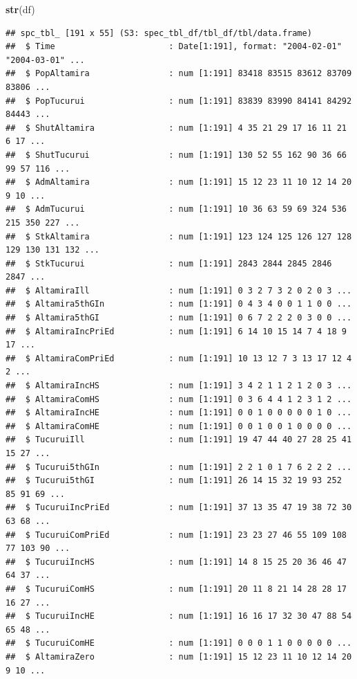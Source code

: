\documentclass[
]{article}
\newenvironment{Shaded}{\begin{snugshade}}{\end{snugshade}}
\newcommand{\FunctionTok}[1]{\textcolor[rgb]{0.13,0.29,0.53}{\textbf{#1}}}
\newcommand{\NormalTok}[1]{#1}
\begin{document}
\begin{Shaded}
\begin{Highlighting}[]
\FunctionTok{str}\NormalTok{(df)}
\end{Highlighting}
\end{Shaded}

\begin{verbatim}
## spc_tbl_ [191 x 55] (S3: spec_tbl_df/tbl_df/tbl/data.frame)
##  $ Time                       : Date[1:191], format: "2004-02-01" "2004-03-01" ...
##  $ PopAltamira                : num [1:191] 83418 83515 83612 83709 83806 ...
##  $ PopTucurui                 : num [1:191] 83839 83990 84141 84292 84443 ...
##  $ ShutAltamira               : num [1:191] 4 35 21 29 17 16 11 21 6 17 ...
##  $ ShutTucurui                : num [1:191] 130 52 55 162 90 36 66 99 57 116 ...
##  $ AdmAltamira                : num [1:191] 15 12 23 11 10 12 14 20 9 10 ...
##  $ AdmTucurui                 : num [1:191] 10 36 63 59 69 324 536 215 350 227 ...
##  $ StkAltamira                : num [1:191] 123 124 125 126 127 128 129 130 131 132 ...
##  $ StkTucurui                 : num [1:191] 2843 2844 2845 2846 2847 ...
##  $ AltamiraIll                : num [1:191] 0 3 2 7 3 2 0 2 0 3 ...
##  $ Altamira5thGIn             : num [1:191] 0 4 3 4 0 0 1 1 0 0 ...
##  $ Altamira5thGI              : num [1:191] 0 6 7 2 2 2 0 3 0 0 ...
##  $ AltamiraIncPriEd           : num [1:191] 6 14 10 15 14 7 4 18 9 17 ...
##  $ AltamiraComPriEd           : num [1:191] 10 13 12 7 3 13 17 12 4 2 ...
##  $ AltamiraIncHS              : num [1:191] 3 4 2 1 1 2 1 2 0 3 ...
##  $ AltamiraComHS              : num [1:191] 0 3 6 4 4 1 2 3 1 2 ...
##  $ AltamiraIncHE              : num [1:191] 0 0 1 0 0 0 0 0 1 0 ...
##  $ AltamiraComHE              : num [1:191] 0 0 1 0 0 1 0 0 0 0 ...
##  $ TucuruiIll                 : num [1:191] 19 47 44 40 27 28 25 41 15 27 ...
##  $ Tucurui5thGIn              : num [1:191] 2 2 1 0 1 7 6 2 2 2 ...
##  $ Tucurui5thGI               : num [1:191] 26 14 15 32 19 93 252 85 91 69 ...
##  $ TucuruiIncPriEd            : num [1:191] 37 13 35 47 19 38 72 30 63 68 ...
##  $ TucuruiComPriEd            : num [1:191] 23 23 27 46 55 109 108 77 103 90 ...
##  $ TucuruiIncHS               : num [1:191] 14 8 15 25 20 36 46 47 64 37 ...
##  $ TucuruiComHS               : num [1:191] 20 11 8 21 14 28 28 17 16 27 ...
##  $ TucuruiIncHE               : num [1:191] 16 16 17 32 30 47 88 54 65 48 ...
##  $ TucuruiComHE               : num [1:191] 0 0 0 1 1 0 0 0 0 0 ...
##  $ AltamiraZero               : num [1:191] 15 12 23 11 10 12 14 20 9 10 ...

\end{verbatim}
\end{document}
